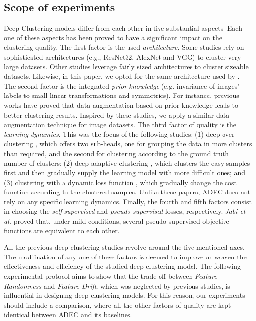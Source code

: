 \documentclass{article}
\begin{document}
\subsection{Scope of experiments}
Deep Clustering models differ from each other in five substantial aspects. Each one of these aspects has been proved to have a significant impact on the clustering quality.
The first factor is the used \textit{architecture}. Some studies \cite{paper24, paper71} rely on sophisticated architectures (e.g., ResNet32, AlexNet and VGG) to cluster very large datasets. Other studies \cite{paper27, paper28} leverage fairly sized architectures to cluster sizeable datasets. Likewise, in this paper, we opted for the same architecture used by \cite{paper27, paper28, paper35, paper29}. The second factor is the integrated \textit{prior knowledge} (e.g. invariance of images' labels to small linear transformations and symmetries). For instance, previous works \cite{paper26, paper34} have proved that data augmentation based on prior knowledge leads to better clustering results. Inspired by these studies, we apply a similar data augmentation technique for image datasets.
The third factor of quality is the \textit{learning dynamics}. This was the focus of the following studies: (1) deep over-clustering \cite{paper71}, which offers two sub-heads, one for grouping the data in more clusters than required, and the second for clustering according to the ground truth number of clusters; (2) deep adaptive clustering \cite{paper23}, which clusters the easy samples first and then gradually supply the learning model with more difficult ones; and (3) clustering with a dynamic loss function \cite{paper72}, which gradually change the cost function according to the clustered samples. Unlike these papers, ADEC does not rely on any specific learning dynamics. Finally, the fourth and fifth factors consist in choosing the \textit{self-supervised} and \textit{pseudo-supervised} losses, respectively. \textit{Jabi et al.} \cite{paper73} proved that, under mild conditions, several pseudo-supervised objective functions are equivalent to each other.

All the previous deep clustering studies revolve around the five mentioned axes. The modification of any one of these factors is deemed to improve or worsen the effectiveness and efficiency of the studied deep clustering model. The following experimental protocol aims to show that the trade-off between \textit{Feature Randomness} and \textit{Feature Drift}, which was neglected by previous studies, is influential in designing deep clustering models. For this reason, our experiments should include a comparison, where all the other factors of quality are kept identical between ADEC and its baselines. 
\end{document}
